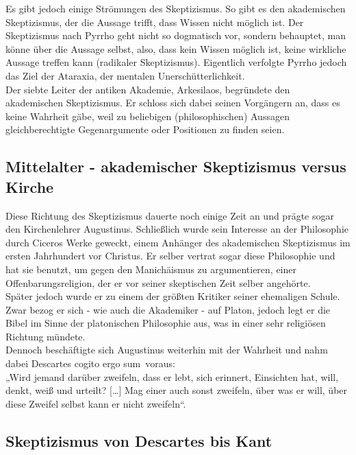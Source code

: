 \documentclass[12pt,a4paper]{article}
\begin{document}
Es gibt jedoch einige Strömungen des Skeptizismus. So gibt es den akademischen Skeptizismus, der die Aussage trifft, dass Wissen nicht möglich ist. Der Skeptizismus nach Pyrrho geht nicht so dogmatisch vor, sondern behauptet, man könne über die Aussage selbst, also, dass kein Wissen möglich ist, keine wirkliche Aussage treffen kann (radikaler Skeptizismus).%
Eigentlich verfolgte Pyrrho jedoch das Ziel der Ataraxia, der mentalen Unerschütterlichkeit.\\

Der siebte Leiter der antiken Akademie, Arkesilaos, begründete den akademischen Skeptizismus. Er schloss sich dabei seinen Vorgängern an, dass es keine Wahrheit gäbe, weil zu beliebigen (philosophischen) Aussagen gleichberechtigte Gegenargumente oder Positionen zu finden seien.
	\subsection{Mittelalter - akademischer Skeptizismus versus Kirche}
Diese Richtung des Skeptizismus dauerte noch einige Zeit an und prägte sogar den Kirchenlehrer Augustinus. Schließlich wurde sein Interesse an der Philosophie durch Ciceros Werke geweckt, einem Anhänger des akademischen Skeptizismus im ersten Jahrhundert vor Christus. Er selber vertrat sogar diese Philosophie und hat sie benutzt, um gegen den Manichäismus zu argumentieren, einer Offenbarungsreligion, der er vor seiner skeptischen Zeit selber angehörte.\\%
Später jedoch wurde er zu einem der größten Kritiker seiner ehemaligen Schule. Zwar bezog er sich - wie auch die Akademiker - auf Platon, jedoch legt er die Bibel im Sinne der platonischen Philosophie aus, was in einer sehr religiösen Richtung mündete.\\%
Dennoch beschäftigte sich Augustinus weiterhin mit der Wahrheit und nahm dabei Descartes \glqq cogito ergo sum\grqq\ voraus:\\
„Wird jemand darüber zweifeln, dass er lebt, sich erinnert, Einsichten hat, will, denkt, weiß und urteilt? […] Mag einer auch sonst zweifeln, über was er will, über diese Zweifel selbst kann er nicht zweifeln“.
	\subsection{Skeptizismus von Descartes bis Kant}
\end{document}

